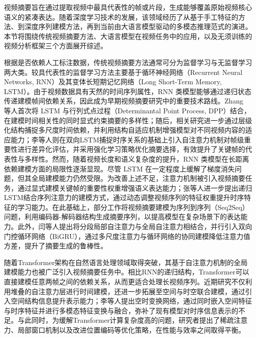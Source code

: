 
视频摘要旨在通过提取视频中最具代表性的帧或片段，生成能够覆盖原始视频核心语义的紧凑表达。随着深度学习技术的发展，该领域经历了从基于手工特征的方法、到深度序列建模方法，再到当前由大语言模型驱动的多模态推理范式的演进。本节将围绕传统视频摘要方法、大语言模型在视频任务中的应用，以及无须训练的视频分析框架三个方面展开综述。

根据是否依赖人工标注数据，传统视频摘要方法通常可分为监督学习与无监督学习两大类。较具代表性的监督学习方法主要基于循环神经网络（Recurrent Neural Networks, RNN）\cite{rumelhart1986learning}及其变体长短期记忆网络（Long Short-Term Memory, LSTM）\cite{graves2012long}。由于视频数据具有天然的时间序列属性，RNN 类模型能够通过递归状态传递建模帧间依赖关系，因此成为早期视频摘要研究中的重要技术路线。Zhang 等人\cite{zhang2016video}首次将 LSTM 与行列式点过程（Determinantal Point Process, DPP）\cite{kulesza2012determinantal}结合，在建模时间相关性的同时显式约束摘要的多样性；随后，相关研究进一步通过层级化结构捕捉多尺度时间依赖\cite{zhao2017hierarchical}，并利用结构自适应机制增强模型对不同视频内容的适应能力\cite{zhao2018hsa}；李等人\cite{li2020sattn}则在双向LSTM捕捉时序关系的基础上引入自注意力机制对帧级重要性进行差异化评估，并采用强化学习策略优化摘要选择，有效提升了关键帧的代表性与多样性。然而，随着视频长度和语义复杂度的提升，RNN 类模型在长距离依赖建模方面的局限性逐渐显现。尽管 LSTM 在一定程度上缓解了梯度消失问题，但其全局建模能力仍然受限。为改善上述不足，注意力机制被引入视频摘要任务，通过显式建模关键帧的重要性权重增强语义表达能力\cite{lebron2018video,ji2020deep,fajtl2019summarizing,li2021exploring}；张等人\cite{zhang2023relstm}进一步提出递归LSTM结合序列注意力的建模方式，通过动态调整视频序列的特征权重提升时序特征的学习能力。在此基础上，部分工作将视频摘要建模为序列到序列（Seq2Seq）问题，利用编码器-解码器结构生成摘要序列\cite{ji2019video,rochan2018video,lal2019online}，以提高模型在复杂场景下的表达能力。此外，闫等人\cite{yan2024lgru}提出将分段局部自注意力与全局自注意力相结合，并行引入双向门控循环网络（BiGRU），通过多尺度注意力与循环网络的协同建模降低注意力值方差，提升了摘要生成的鲁棒性。

随着Transformer架构\cite{vaswani2017attention}在自然语言处理领域取得突破，其基于自注意力机制的全局建模能力也被广泛引入视频摘要任务中。相比RNN的递归结构，Transformer可以直接建模任意两帧之间的依赖关系，从而更适合处理长视频序列。近期研究不仅利用堆叠的自注意力层进行时间建模\cite{argaw2024scaling,chen2022video,lin2023videoxum}，还进一步拓展至空间与时空联合建模，通过引入空间结构信息提升表示能力\cite{liang2022video,liu2022video,hsu2023video,son2024csta}；李等人\cite{li2022sttn}提出空时变换网络，通过同时嵌入空间特征与时序特征并进行多模态特征变换与融合，弥补了现有模型对时序信息表示的不足。与此同时，为缓解Transformer计算复杂度高的问题，研究者提出了稀疏注意力\cite{child2019generating}、局部窗口机制\cite{liu2021swin}以及改进位置编码等优化策略，在性能与效率之间取得平衡。

